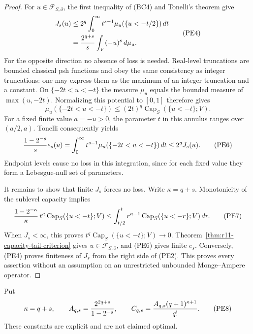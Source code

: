 \begin{proof}
For $u\in\mathcal F_{S,\partial}$, the first inequality of (BC4)
and Tonelli's theorem give
\[
 \begin{split}
 J_s(u)
 &\leq2^q\int_0^\infty t^{s-1}\mu_u(\{u<-t/2\})\,dt\\
 &= {2^{q+s}\over s}\int_V(-u)^s\,d\mu_u.
 \end{split}
 \tag{PE4}
\]
For the opposite direction no absence of loss is needed.
Real-level truncations are bounded classical psh functions and
obey the same consistency as integer truncations: one may express
them as the maximum of an integer truncation and a constant.
On $\{-2t<u<-t\}$ the measure $\mu_u$ equals the bounded
measure of $\max(u,-2t)$. Normalizing this potential to $[0,1]$
therefore gives
\[
       \mu_u(\{-2t<u<-t\})
          \leq(2t)^q\operatorname{Cap}_S(\{u<-t\};V).
 \tag{PE5}
\]
For a fixed finite value $a=-u>0$, the parameter $t$ in this
annulus ranges over $(a/2,a)$. Tonelli consequently yields
\[
 {1-2^{-s}\over s}e_s(u)
   =\int_0^\infty t^{s-1}
                 \mu_u(\{-2t<u<-t\})\,dt
   \leq2^qJ_s(u).
 \tag{PE6}
\]
Endpoint levels cause no loss in this integration, since for each
fixed value they form a Lebesgue-null set of parameters.

It remains to show that finite $J_s$ forces no loss. Write
$\kappa=q+s$. Monotonicity of the sublevel capacity implies
\[
 {1-2^{-\kappa}\over\kappa}\,
       t^\kappa\operatorname{Cap}_S(\{u<-t\};V)
 \leq\int_{t/2}^t r^{\kappa-1}
                 \operatorname{Cap}_S(\{u<-r\};V)\,dr.
 \tag{PE7}
\]
When $J_s<\infty$, this proves
$t^q\operatorname{Cap}_S(\{u<-t\};V)\to0$.
Theorem~\ref{thm:r11-capacity-tail-criterion} gives
$u\in\mathcal F_{S,\partial}$, and (PE6) gives finite $e_s$.
Conversely, (PE4) proves finiteness of $J_s$ from the right side
of (PE2). This proves every assertion without an assumption on
an unrestricted unbounded Monge--Ampere operator.
\end{proof}

Put
\[
 \kappa=q+s,\qquad
 A_{q,s}={2^{2q+s}\over1-2^{-s}},\qquad
 C_{q,s}={A_{q,s}(q+1)^{\kappa+1}\over q!}.
 \tag{PE8}
\]
These constants are explicit and are not claimed optimal.

